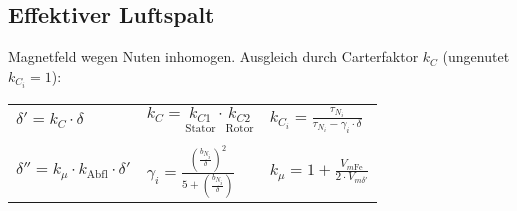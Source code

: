 \begin{sectionbox}
\subsection{Effektiver Luftspalt}
Magnetfeld wegen Nuten inhomogen. Ausgleich durch Carterfaktor $k_C$ (ungenutet $k_{C_i} = 1$):\\
\begin{tabular}{lll}
$\delta' = k_C\cdot\delta$ & $k_C = \underset{\text{Stator}}{k_{C1}}\cdot \underset{\text{Rotor}}{k_{C2}}$ & $k_{C_i} = \frac{\tau_{N_i}}{\tau_{N_i} -\gamma_i \cdot\delta}$\\\\
$\delta'' = k_\mu\cdot k_\text{Abfl}\cdot\delta'$ &
$\gamma_i = \frac{\left(\frac{b_{N_i}}{\delta}\right)^2}{5+\left(\frac{b_{N_i}}{\delta}\right)}$ &
$k_\mu = 1 + \frac{V_{m\text{Fe}}}{2\cdot V_{m\delta'}}$
\end{tabular}
\end{sectionbox}

